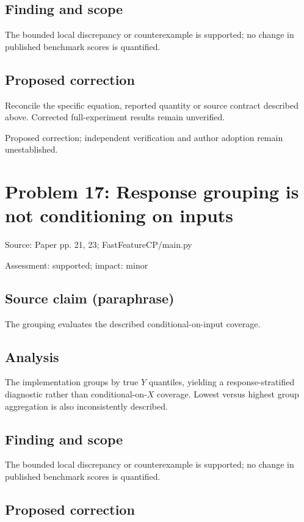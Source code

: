 \documentclass[11pt]{article}
\begin{document}
\subsection*{Finding and scope}

The bounded local discrepancy or counterexample is supported; no change in published benchmark scores is quantified.

\subsection*{Proposed correction}

Reconcile the specific equation, reported quantity or source contract described above. Corrected full-experiment results remain unverified.

Proposed correction; independent verification and author adoption remain unestablished.

\section*{Problem 17: Response grouping is not conditioning on inputs}

Source: Paper pp. 21, 23; FastFeatureCP/main.py

Assessment: supported; impact: minor

\subsection*{Source claim (paraphrase)}

The grouping evaluates the described conditional-on-input coverage.

\subsection*{Analysis}

The implementation groups by true \(Y\) quantiles, yielding a response-stratified diagnostic rather than conditional-on-\(X\) coverage. Lowest versus highest group aggregation is also inconsistently described.

\subsection*{Finding and scope}

The bounded local discrepancy or counterexample is supported; no change in published benchmark scores is quantified.

\subsection*{Proposed correction}
\end{document}

